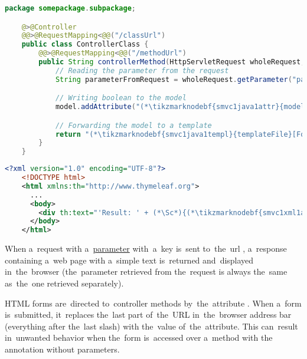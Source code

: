 \begin{lstlisting}[language=Java, title={Controller class}]
    package somepackage.subpackage;

    @>@Controller
    @@>@RequestMapping<@@("/classUrl")
    public class ControllerClass {
        @@>@RequestMapping<@@("/methodUrl")
        public String controllerMethod(HttpServletRequest wholeRequest, @@>@RequestParam<@@("paramKey") String singleParameter, Model model) {
            // Reading the parameter from the request
            String parameterFromRequest = wholeRequest.getParameter("paramKey");

            // Writing boolean to the model
            model.addAttribute("(*\tikzmarknodebf{smvc1java1attr}{modelAttribute}[ForestGreen]*)", parameterFromRequest.equals(singleParameter));

            // Forwarding the model to a template
            return "(*\tikzmarknodebf{smvc1java1templ}{templateFile}[ForestGreen]*)";
        }
    }
\end{lstlisting}
\begin{lstlisting}[language=XML, title={Thymeleaf template file called \tikzmarknodebf{smvc1xml1templ}{\textit{templateFile}}\textit{.html}}]
    <?xml version="1.0" encoding="UTF-8"?>
    <!DOCTYPE html>
    <html xmlns:th="http://www.thymeleaf.org">
      ...
      <body>
        <div th:text="'Result: ' + (*\Sc*){(*\tikzmarknodebf{smvc1xml1attr}{modelAttribute}[ForestGreen]*)}"></div>
      </body>
    </html>
\end{lstlisting}

\noindent When a~request with a~\hyperref[jspattributeparameter]{parameter} with~a~key  is~sent to~the~url , a~response containing a~web page with a~simple text  is~returned and~displayed in~the~browser (the~parameter retrieved from the~request is always the~same as~the~one retrieved separately).

\warning HTML forms are~directed to~controller methods by~the~attribute .
When a~form is~submitted, it~replaces the~last part of~the~URL in~the~browser address bar (everything after the~last slash) with the~value of~the~attribute.
This can~result in~unwanted behavior when the~form is~accessed over a~method with the~ annotation without parameters.

